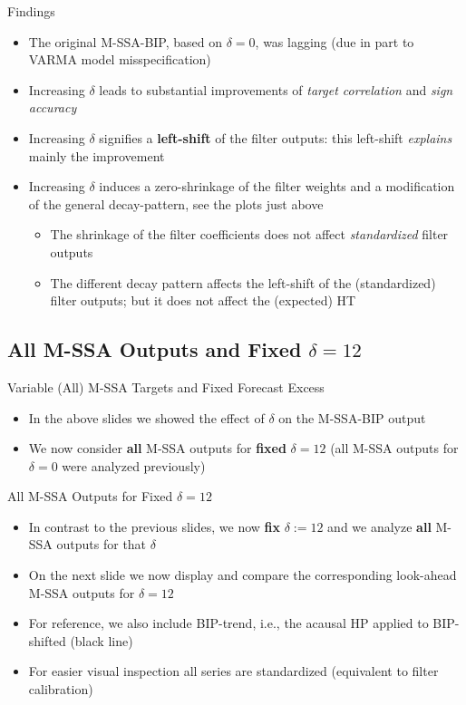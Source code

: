 \documentclass{beamer}
\begin{document}
\begin{frame} {Findings}
\begin{itemize}
\item The original M-SSA-BIP, based on $\delta=0$, was lagging (due in part to VARMA model misspecification)
\item Increasing $\delta$ leads to substantial improvements of \emph{target correlation} and \emph{sign accuracy}
\item Increasing $\delta$ signifies a \textbf{left-shift} of the filter outputs: this left-shift \emph{explains} mainly the improvement  
\item Increasing $\delta$ induces a zero-shrinkage of the filter weights and a modification of the general decay-pattern, see the plots just above
\begin{itemize}
\item The shrinkage of the filter coefficients does not affect \emph{standardized} filter outputs
\item The different decay pattern affects the left-shift of the (standardized) filter outputs; but it does not affect the (expected) HT
\end{itemize}
\end{itemize}
\end{frame}





\subsection{All M-SSA Outputs and Fixed $\delta=12$}

\begin{frame} {Variable (All) M-SSA Targets and Fixed Forecast Excess}
\begin{itemize}
\item In the above slides we showed the effect of $\delta$ on the M-SSA-BIP output 
\item We now consider \textbf{all} M-SSA outputs for \textbf{fixed} $\delta=12$ (all M-SSA outputs for $\delta=0$ were analyzed previously)
\end{itemize}

\end{frame}


\begin{frame} {All M-SSA Outputs for Fixed $\delta=12$}
\begin{itemize}
\item In contrast to the previous slides, we now \textbf{fix} $\delta:=12$ and we analyze \textbf{all} M-SSA outputs for that $\delta$
\item On the next slide we now display and compare the corresponding look-ahead M-SSA outputs for $\delta=12$  
\item For reference, we also include BIP-trend, i.e., the acausal HP applied to BIP-shifted (black line)
\item For easier visual inspection all series are standardized (equivalent to filter calibration)
\end{itemize}

\end{frame}
\end{document}
